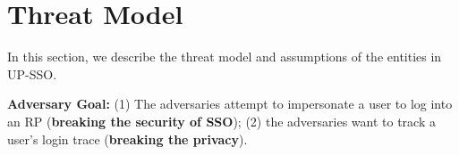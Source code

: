 \section{Threat Model}
\label{sec:threatmodel}
In this section, we describe the threat model and assumptions of the entities in UP-SSO.

\vspace{1mm}\noindent\textbf{Adversary Goal:} (1) The adversaries attempt to impersonate a user to log into an RP (\textbf{breaking the  security of SSO}); (2) the adversaries want to track a user's login trace (\textbf{breaking the privacy}).
\begin{comment}
\item \noindent\textbf{Breaking the security. }The adversaries can impersonate an honest user to log in to the honest RP.
\item \noindent\textbf{Breaking the privacy. }The adversaries can track a user's login trace on each RP.
\end{comment}

